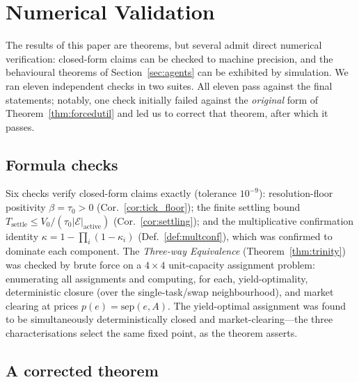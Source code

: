 \documentclass[11pt,twocolumn,a4paper]{article}
\theoremstyle{plain}
\theoremstyle{definition}
\theoremstyle{remark}
\newcommand{\E}{\mathcal{E}}
\newcommand{\tick}{\tau_0}
\newcommand{\sep}{\mathrm{sep}}
\newcommand{\floor}{\beta}
\newcommand{\kap}{\kappa}
\begin{document}
\section{Numerical Validation}
\label{sec:validation}

The results of this paper are theorems, but several admit direct
numerical verification: closed-form claims can be checked to machine
precision, and the behavioural theorems of Section~\ref{sec:agents} can
be exhibited by simulation. We ran eleven independent checks in two
suites. All eleven pass against the final statements; notably, one check
initially failed against the \emph{original} form of
Theorem~\ref{thm:forcedutil} and led us to correct that theorem, after
which it passes.

\subsection{Formula checks}

Six checks verify closed-form claims exactly (tolerance $10^{-9}$):
resolution-floor positivity $\floor=\tick>0$
(Cor.~\ref{cor:tick_floor}); the finite settling bound
$T_{\mathrm{settle}}\le V_0/(\tick|\E|_{\mathrm{active}})$
(Cor.~\ref{cor:settling}); and the multiplicative confirmation identity
$\kap=1-\prod_i(1-\kap_i)$ (Def.~\ref{def:multconf}), which was
confirmed to dominate each component. The \emph{Three-way Equivalence}
(Theorem~\ref{thm:trinity}) was checked by brute force on a
$4{\times}4$ unit-capacity assignment problem: enumerating all
assignments and computing, for each, yield-optimality, deterministic
closure (over the single-task/swap neighbourhood), and market clearing
at prices $p(e)=\sep(e,A)$. The yield-optimal assignment was found to be
simultaneously deterministically closed and market-clearing---the three
characterisations select the same fixed point, as the theorem asserts.

\subsection{A corrected theorem}
\end{document}
